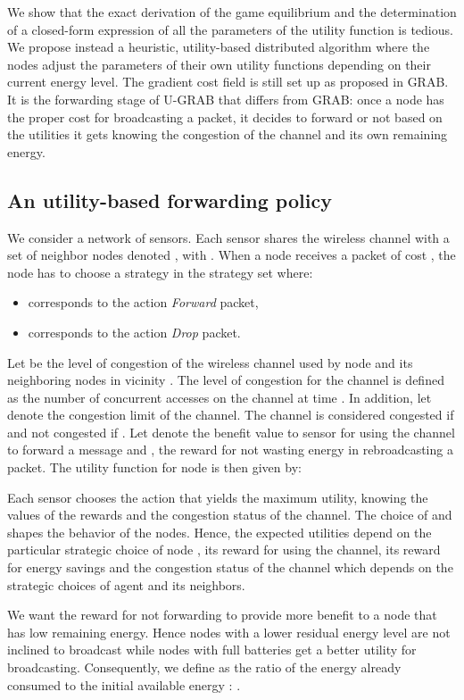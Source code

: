 \documentclass[journal, peerreview, onecolumn, draftcls]{IEEEtran}
\begin{document}
We show that the exact derivation of the game equilibrium and the determination of a closed-form expression of all the parameters of the utility function is tedious. We propose instead a heuristic, utility-based distributed algorithm where the nodes adjust the parameters of their own utility functions depending on their current energy level. The gradient cost field is still set up as proposed in GRAB. It is the forwarding stage of U-GRAB that differs from GRAB: once a node has the proper cost for broadcasting a packet, it decides to forward or not based on the utilities it gets knowing the congestion of the channel and its own remaining energy.

\subsection{An utility-based forwarding policy}

We consider a network of  sensors. Each sensor  shares the wireless channel with a set of neighbor nodes denoted , with . When a node  receives a packet of cost , the node has to choose a strategy  in the strategy set  where:
\begin{itemize}
\item  corresponds to the action {\it Forward} packet,
\item  corresponds to the action {\it Drop} packet.
\end{itemize}

Let  be the level of congestion of the wireless channel used by node  and its neighboring nodes in vicinity . The level of congestion for the channel is defined as the number of concurrent accesses on the channel at time .
In addition, let  denote the congestion limit of the channel. The channel is considered congested if  and not congested if . Let  denote the benefit value to sensor  for using the channel to forward a message and , the reward for not wasting energy in rebroadcasting a packet. The utility function for node  is then given by:


Each sensor chooses the action that yields the maximum utility, knowing the values of the rewards and the congestion status of the channel. The choice of  and  shapes the behavior of the nodes. Hence, the expected utilities depend on the particular strategic choice  of node , its reward  for using the channel, its reward for energy savings  and the congestion status  of the channel which depends on the strategic choices of agent  and its neighbors.

We want the reward for not forwarding  to provide more benefit to a node that has low remaining energy. Hence nodes with a lower residual energy level are not inclined to broadcast while nodes with full batteries get a better utility for broadcasting.
Consequently, we define  as the ratio of the energy already consumed  to the initial available energy : .
\end{document}
